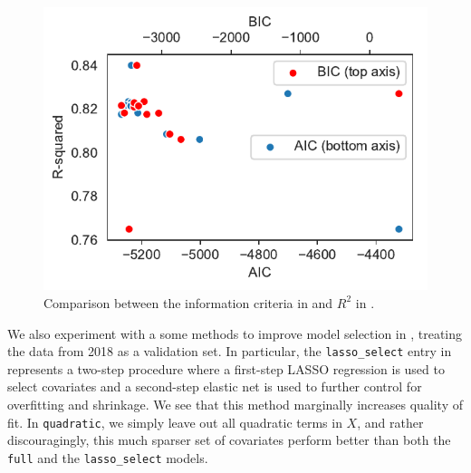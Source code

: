 \documentclass[12pt]{article}
\begin{document}
\begin{figure}[tb]
  \centering
  \includegraphics{ic_rsq.pdf}
  \caption{Comparison between the information criteria in  and $R^2$ in .}
  \label{fig:ic_r2}
\end{figure}

We also experiment with a some methods to improve model selection in , treating the data from 2018 as a validation set. In particular, the \texttt{lasso\_select} entry in  represents a two-step procedure where a first-step LASSO regression is used to select covariates and a second-step elastic net is used to further control for overfitting and shrinkage. We see that this method marginally increases quality of fit. In \texttt{quadratic}, we simply leave out all quadratic terms in $X$, and rather discouragingly, this much sparser set of covariates perform better than both the \texttt{full} and the \texttt{lasso\_select} models. 
\end{document}
